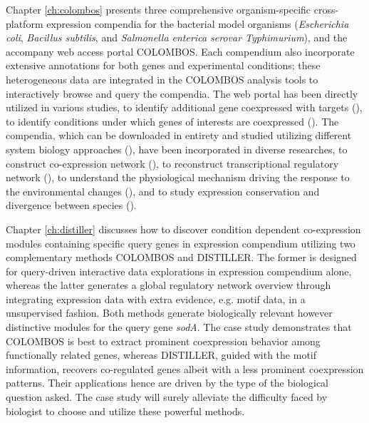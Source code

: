 Chapter \ref{ch:colombos} presents three comprehensive organism-specific 
cross-platform expression compendia for the bacterial model organisms 
(\textit{Escherichia coli}, \textit{Bacillus subtilis}, and \textit{Salmonella 
enterica serovar Typhimurium}), and the accompany web access portal COLOMBOS.
%
Each compendium also incorporate extensive annotations for both genes and 
experimental conditions; these heterogeneous data are integrated 
in the COLOMBOS analysis tools to interactively browse and query the 
compendia. 
%
The web portal has been directly utilized in various studies, to identify 
additional gene coexpressed with targets (\cite{Meysman2011, Fu2012, 
Meysman2014a}), to identify conditions under which genes of 
interests are coexpressed (\cite{Desai2013}).  
%
The compendia, which can be downloaded in entirety and studied 
utilizing different system biology approaches (\cite{Lemmens2009, Michoel2009, 
Zhao2011, DeSmet2011, Zarrineh2011}), have been incorporated in diverse 
researches, to construct co-expression network (\cite{Cloots2011, Kolar2012}), 
to reconstruct transcriptional regulatory network (\cite{Faria2013}), to 
understand the physiological mechanism driving the response to the 
environmental changes (\cite{Balderas-Martinez2013}), and to study expression 
conservation and divergence between species (\cite{Meysman2013}).
%
%



Chapter \ref{ch:distiller} discusses how to discover condition 
dependent co-expression modules containing specific query genes in expression 
compendium utilizing two complementary methods COLOMBOS and DISTILLER.
%
The former is designed for query-driven interactive data explorations in 
expression compendium alone, whereas the latter generates a global regulatory 
network overview through integrating expression data with extra evidence, e.g. 
motif data, in a unsupervised fashion.
%
Both methods generate biologically relevant however distinctive modules for the 
query gene \textit{sodA}.
%
The case study demonstrates that COLOMBOS is best to extract prominent 
coexpression behavior among functionally related genes, whereas DISTILLER, 
guided with the motif information, recovers co-regulated genes albeit with a 
less prominent coexpression patterns.
%
Their applications hence are driven by the type of the biological question 
asked.
%
The case study will surely alleviate the difficulty faced by biologist to 
choose and utilize these powerful methods.



